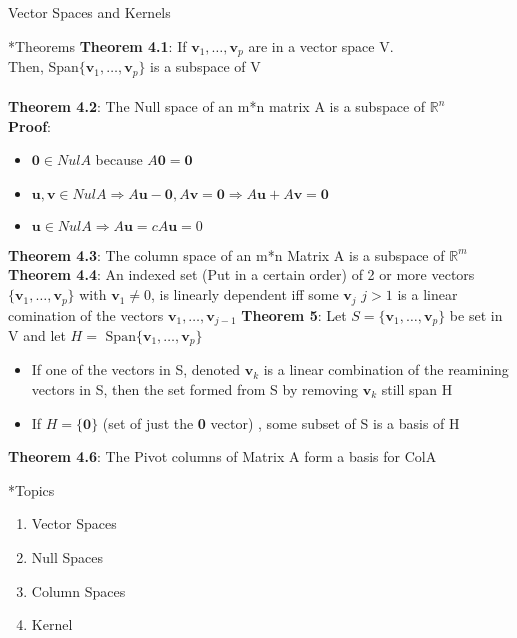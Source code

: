 \documentclass[a4paper, 12pt]{article}
\begin{document}
\begin{section}{Vector Spaces and Kernels}
\begin{subsection}*{Theorems}
\textbf{Theorem 4.1}: If $\textbf{v}_{1},\dots,\textbf{v}_{p}$ are in a
vector space V.\\
Then, Span$\{\textbf{v}_{1},\dots,\textbf{v}_{p}\}$
is a subspace of V\\
\\
\textbf{Theorem 4.2}: The Null space of an m*n matrix A is a subspace
of $\mathbb{R}^{n}$\\
\textbf{Proof}:
\begin{itemize}
\item{$\textbf{0}\in NulA$ because $A\textbf{0}=\textbf{0}$}
\item{$\textbf{u},\textbf{v}\in NulA \Rightarrow A\textbf{u}-\textbf{0},
A\textbf{v}=\textbf{0}\Rightarrow A\textbf{u}+A\textbf{v}=\textbf{0}$}
\item{$\textbf{u}\in NulA \Rightarrow A\textbf{u}=cA\textbf{u}=0$}
\end{itemize}
\textbf{Theorem 4.3}:
The column space of an m*n Matrix A is a subspace of $\mathbb{R}^{m}$
\\
\textbf{Theorem 4.4}: An indexed set (Put in a certain order) of 2 or
more vectors $\{\textbf{v}_{1}, \dots, \textbf{v}_{p}\}$ with 
$\textbf{v}_{1}\neq 0$, is linearly dependent iff some $\textbf{v}_{j}$ 
$j>1$ is a linear comination of the vectors $\textbf{v}_{1},\dots,
\textbf{v}_{j-1}$
\noindent\textbf{Theorem 5}: Let $S=\{\textbf{v}_{1},\dots,
\textbf{v}_{p}\}$ be set in V and let $H=\mbox{ Span}\{
\textbf{v}_{1},\dots,\textbf{v}_{p}\}$
\begin{itemize}
\item{If one of the vectors in S, denoted $\textbf{v}_{k}$ is a 
linear combination of the reamining vectors in S, then the set
 formed from S by removing $\textbf{v}_{k}$ still span H}
\item{If $H=\{\textbf{0\}}$ (set of just the \textbf{0} vector)
, some subset of S is a basis of H} 
\end{itemize}
\noindent\textbf{Theorem 4.6}: The Pivot columns of Matrix A form a basis for ColA
\end{subsection}
\begin{subsection}*{Topics}
\begin{enumerate}
\item{Vector Spaces}
\item{Null Spaces}
\item{Column Spaces}
\item{Kernel}

\end{enumerate}
\end{subsection}
\end{section}
\end{document}
